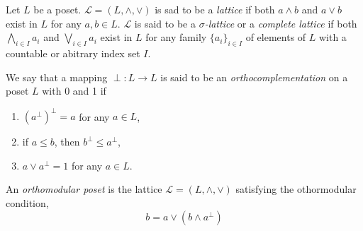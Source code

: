 \begin{definition}[Lattice]
    Let \(L\) be a poset. \(\mathcal{L} = (L,\wedge,\vee) \) is sad to be a \emph{lattice} if both \(a\wedge b\) and \(a \vee b\) exist in \(L\) for any \(a,b \in L\). \(\mathcal{L}\) is said to be a \emph{\(\sigma\)-lattice} or a \emph{complete lattice} if both \(\bigwedge_{i \in I} a_i\) and \(\bigvee_{i \in I} a_i\) exist in \(L\) for any family \(\{a_i\}_{i\in I}\) of elements of \(L\) with a countable or abitrary index set \(I\).
\end{definition}

\begin{definition}
    We say that a mapping \(\perp: L \to L\) is said to be an \emph{orthocomplementation} on a poset \(L\) with 0 and 1 if
\begin{enumerate}
    \item \((a^\perp)^\perp = a\) for any \(a \in L\),
    \item if \(a \le b\), then \(b^\perp \le a^\perp \),
    \item \(a \vee a^\perp=1\) for any \(a \in L\).
\end{enumerate}
\end{definition}

\begin{definition}
    An \emph{orthomodular poset} is the lattice \(\mathcal{L}=(L,\wedge,\vee)\) satisfying the othormodular condition,
    \[b=a \vee (b \wedge a^{\perp})\]
\end{definition}